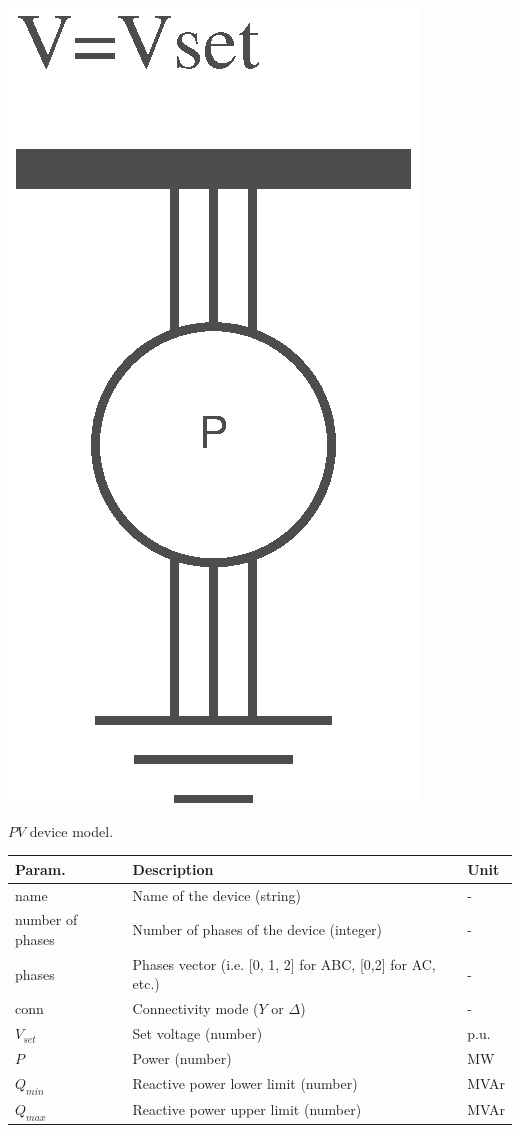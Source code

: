 \documentclass[nols,a4paper,twoside,symmetric,notoc,fleqn]{tufte-book}
\begin{document}
\begin{marginfigure}
	\includegraphics[width=0.4\linewidth]{img/PV_model.eps}
	\caption{$PV$ device model.}
	\label{pv_model}
\end{marginfigure}

\begin{table}[h!]
	\begin{tabular}{|p{2cm}|p{5cm}|p{2cm}|}
		\hline 
		\rowcolor{maincolor}
		{\color{white} Param.} & {\color{white} Description} & {\color{white} Unit} \\ 
		\hline 
		name & Name of the device (string) & - \\ 
		\hline 
		number of phases & Number of phases of the device (integer) & - \\ 
		\hline 
		phases & Phases vector (i.e. [0, 1, 2] for ABC, [0,2] for AC, etc.) &- \\ 
		\hline 
		conn & Connectivity mode ($Y$ or $\Delta$) & - \\ 
		\hline 
		$V_{set}$ & Set voltage (number) & p.u. \\ 
		\hline 
		$P$ & Power (number) & MW \\ 
		\hline
		$Q_{min}$ & Reactive power lower limit (number) & MVAr \\ 
		\hline
		$Q_{max}$ & Reactive power upper limit (number) & MVAr \\ 
		\hline
	\end{tabular} 
\end{table}

\vspace{0.5cm}
\end{document}

